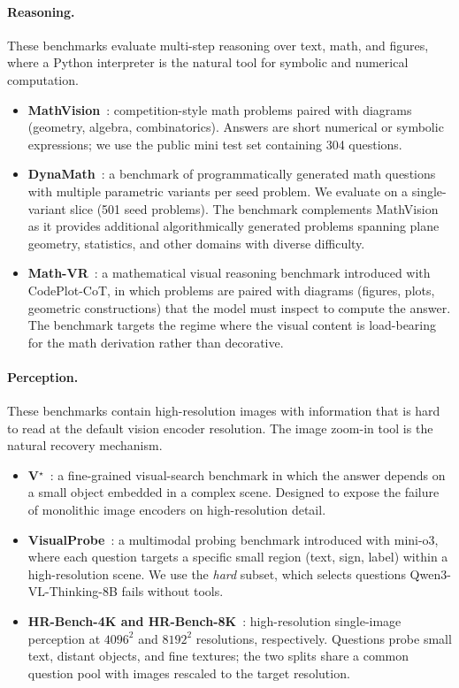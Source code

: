 \paragraph{Reasoning.} These benchmarks evaluate multi-step reasoning over text, math, and figures, where a Python interpreter is the natural tool for symbolic and numerical computation.
\begin{itemize}[leftmargin=*, itemsep=2pt]
    \item \textbf{MathVision}~\citep{mathvision}: competition-style math problems paired with diagrams (geometry, algebra, combinatorics). Answers are short numerical or symbolic expressions; we use the public mini test set containing 304 questions.
    \item \textbf{DynaMath}~\citep{dynamath}: a benchmark of programmatically generated math questions with multiple parametric variants per seed problem. We evaluate on a single-variant slice (501 seed problems). The benchmark  complements MathVision as it provides additional algorithmically generated problems spanning plane geometry, statistics, and other domains with diverse difficulty.
    \item \textbf{Math-VR}~\citep{mathvr}: a mathematical visual reasoning benchmark introduced with CodePlot-CoT, in which problems are paired with diagrams (figures, plots, geometric constructions) that the model must inspect to compute the answer. The benchmark targets the regime where the visual content is load-bearing for the math derivation rather than decorative.
\end{itemize}

\paragraph{Perception.} These benchmarks contain high-resolution images with information that is hard to read at the default vision encoder resolution. The image zoom-in tool is the natural recovery mechanism.
\begin{itemize}[leftmargin=*, itemsep=2pt]
    \item \textbf{V$^{\star}$}~\citep{vstar}: a fine-grained visual-search benchmark in which the answer depends on a small object embedded in a complex scene. Designed to expose the failure of monolithic image encoders on high-resolution detail.
    \item \textbf{VisualProbe}~\citep{mini-o3}: a multimodal probing benchmark introduced with mini-o3, where each question targets a specific small region (text, sign, label) within a high-resolution scene. We use the \emph{hard} subset, which selects questions Qwen3-VL-Thinking-8B fails without tools.
    \item \textbf{HR-Bench-4K and HR-Bench-8K}~\citep{HRBench}: high-resolution single-image perception at $4096^2$ and $8192^2$ resolutions, respectively. Questions probe small text, distant objects, and fine textures; the two splits share a common question pool with images rescaled to the target resolution.
\end{itemize}

